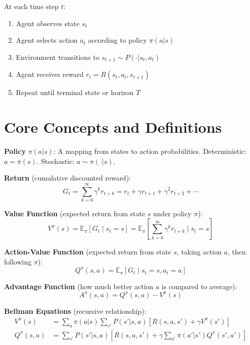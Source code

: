 \begin{intuitionbox}
At each time step $t$:

\begin{enumerate}
  \item Agent observes state $s_t$
  \item Agent selects action $a_t$ according to policy $\pi(a|s)$
  \item Environment transitions to $s_{t+1} \sim P(\cdot|s_t, a_t)$
  \item Agent receives reward $r_t = R(s_t, a_t, s_{t+1})$
  \item Repeat until terminal state or horizon $T$
\end{enumerate}
\end{intuitionbox}

\section{Core Concepts and Definitions}
\label{core-concepts-and-definitions}

\textbf{Policy} $\pi(a|s)$: A mapping from states to action probabilities. Deterministic: $a = \pi(s)$. Stochastic: $a \sim \pi(\cdot|s)$.

\textbf{Return} (cumulative discounted reward): 
\begin{equation}
G_t = \sum_{k=0}^{\infty} \gamma^k r_{t+k} = r_t + \gamma r_{t+1} + \gamma^2 r_{t+2} + \cdots
\end{equation}

\textbf{Value Function} (expected return from state $s$ under policy $\pi$): 
\begin{equation}
V^\pi(s) = \mathbb{E}_\pi\left[G_t \mid s_t = s\right] = \mathbb{E}_\pi\left[\sum_{k=0}^{\infty} \gamma^k r_{t+k} \mid s_t = s\right]
\end{equation}

\textbf{Action-Value Function} (expected return from state $s$, taking action $a$, then following $\pi$): 
\begin{equation}
Q^\pi(s, a) = \mathbb{E}_\pi\left[G_t \mid s_t = s, a_t = a\right]
\end{equation}

\textbf{Advantage Function} (how much better action $a$ is compared to average): 
\begin{equation}
A^\pi(s, a) = Q^\pi(s, a) - V^\pi(s)
\end{equation}

\textbf{Bellman Equations} (recursive relationship): 
\begin{align}
V^\pi(s) &= \sum_a \pi(a|s) \sum_{s'} P(s'|s,a)\left[R(s,a,s') + \gamma V^\pi(s')\right] \\
Q^\pi(s,a) &= \sum_{s'} P(s'|s,a)\left[R(s,a,s') + \gamma \sum_{a'} \pi(a'|s') Q^\pi(s', a')\right]
\end{align}

